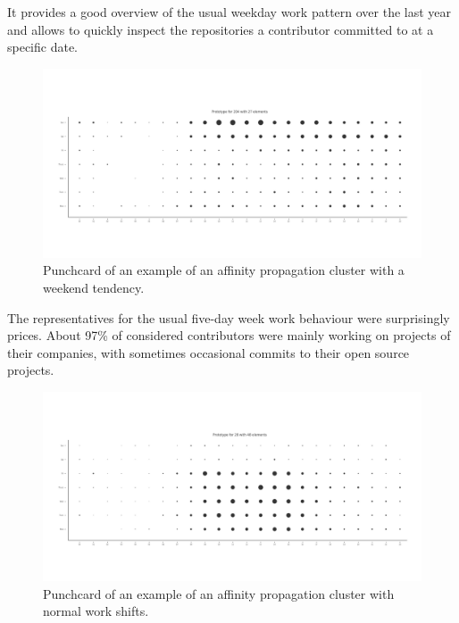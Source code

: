 It provides a good overview of the usual weekday work pattern over the last year and allows to quickly inspect the repositories a contributor committed to at a specific date.

\begin{figure}[H]
    \includegraphics[scale=0.32]{./graphs/analysis-affinity/204}
    \centering
    \caption{Punchcard of an example of an affinity propagation cluster with a weekend tendency.}\label{fig:random-sleep-rhythm}
\end{figure}

The representatives for the usual five-day week work behaviour were surprisingly prices.
About 97\% of considered contributors were mainly working on projects of their companies, with sometimes occasional commits to their open source projects.

\begin{figure}[H]
    \includegraphics[scale=0.32]{./graphs/analysis-affinity/28}
    \centering
    \caption{Punchcard of an example of an affinity propagation cluster with normal work shifts.}\label{fig:random-sleep-rhythm}
\end{figure}
